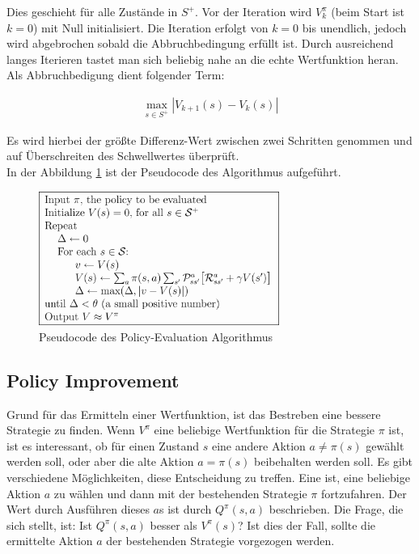 \documentclass[10pt]{scrartcl}
\begin{document}
Dies geschieht für alle Zustände in $S^+$. Vor der Iteration wird $V^\pi_k$  (beim Start ist $k=0$) mit Null initialisiert. Die Iteration erfolgt von $k=0$ bis unendlich, jedoch wird abgebrochen sobald die  Abbruchbedingung erfüllt ist. Durch ausreichend langes Iterieren tastet man sich beliebig nahe an die echte Wertfunktion heran. Als Abbruchbedigung dient folgender Term:

\begin{align*}
\max\limits_{s\in S^+} |V_{k+1}(s)-V_k(s)|
\end{align*}

Es wird hierbei der größte Differenz-Wert zwischen zwei Schritten genommen und  auf Überschreiten des Schwellwertes überprüft.\\
In der Abbildung \ref{fig:policyevaluation} ist der Pseudocode des Algorithmus aufgeführt.

\begin{figure}[htc]
    \centering
    \includegraphics[width=0.7\textwidth]{Grafiken/21pe.png}
    \caption{Pseudocode des Policy-Evaluation Algorithmus}
    \label{fig:policyevaluation}
\end{figure}

\subsection{Policy Improvement}
Grund für das Ermitteln einer Wertfunktion, ist das Bestreben eine bessere Strategie zu finden. Wenn $V^\pi$ eine beliebige Wertfunktion für die  Strategie $\pi$ ist,  ist es interessant, ob für einen Zustand $s$ eine andere Aktion $a\neq\pi(s)$   gewählt werden soll, oder aber die alte Aktion $a=\pi(s)$ beibehalten werden soll.
Es gibt verschiedene Möglichkeiten, diese  Entscheidung zu treffen. Eine ist, eine beliebige Aktion $a$ zu wählen und dann mit der bestehenden Strategie $\pi$ fortzufahren. Der Wert durch Ausführen dieses $a$s ist durch $Q^\pi(s,a)$ beschrieben. Die Frage, die sich stellt, ist: Ist $Q^\pi(s,a)$ besser als $V^\pi(s)$?
Ist dies der Fall, sollte die ermittelte Aktion $a$ der bestehenden Strategie vorgezogen werden.
\end{document}
